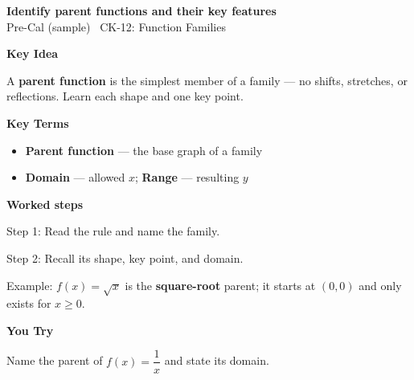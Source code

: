 \documentclass[12pt]{article}
\begin{document}
\begin{center}{\Large \textbf{Identify parent functions and their key features}}\\[2pt]{\small Pre-Cal (sample) \textbar\ CK-12: Function Families}\end{center}\vspace{0.25cm}

{\large\textbf{Key Idea}}\par\smallskip
A \textbf{parent function} is the simplest member of a family — no shifts, stretches, or reflections. Learn each shape and one key point.\par


{\large\textbf{Key Terms}}\par\smallskip
\begin{itemize}[leftmargin=1.4em]
  \item \textbf{Parent function} — the base graph of a family
  \item \textbf{Domain} — allowed $x$; \textbf{Range} — resulting $y$
\end{itemize}


{\large\textbf{Worked steps}}\par\smallskip
Step 1: Read the rule and name the family.\par
Step 2: Recall its shape, key point, and domain.\par
Example: $f(x)=\sqrt{x}$ is the \textbf{square-root} parent; it starts at $(0,0)$ and only exists for $x\ge 0$.\par


{\large\textbf{You Try}}\par\smallskip
Name the parent of $f(x)=\dfrac{1}{x}$ and state its domain.\par
\end{document}
